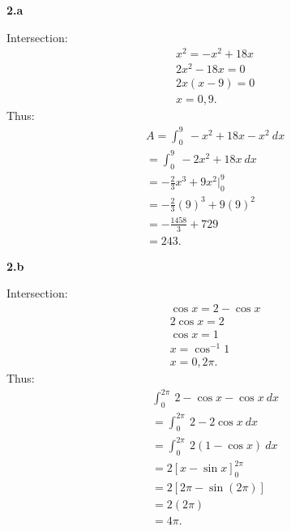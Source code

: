 \documentclass{report}
\begin{document}
    \bigbreak \noindent 
    \textbf{2.a}
    \bigbreak \noindent 
    \begin{minipage}[]{0.47\textwidth}
    \end{minipage}
    \begin{minipage}[]{0.47\textwidth}
    Intersection:
    \begin{align*}
        &x^{2} = -x^{2} + 18x \\
        &2x^{2} - 18x = 0  \\
        & 2x(x-9) = 0 \\
        &x=0,9
    .\end{align*}
    Thus:
    \begin{align*}
        &A = \int_{0}^{9}\ -x^{2}+18x-x^{2}\ dx \\
        &= \int_{0}^{9}\ -2x^{2}+18x\ dx \\
        &= -\frac{2}{3}x^{3} + 9x^{2} \bigg|_0^9 \\
        &= -\frac{2}{3}(9)^{3} + 9(9)^{2} \\
        &= -\frac{1458}{3} + 729 \\
        &=243
    .\end{align*}
    \end{minipage}
    \bigbreak \noindent 
    \textbf{2.b}
    \bigbreak \noindent 
    \begin{minipage}[]{0.47\textwidth}
    \end{minipage}
    \begin{minipage}[]{0.47\textwidth}
    Intersection:
    \begin{align*}
        &\cos{x} = 2-\cos{x} \\
        & 2\cos{x} = 2 \\
        &\cos{x} = 1 \\
        &x= \cos^{-1}{1} \\
        &x=0,2\pi
    .\end{align*}
    \bigbreak \noindent 
    Thus:
    \begin{align*}
        &\int_{0}^{2\pi}\ 2-\cos{x} - \cos{x}\ dx \\
        &=\int_{0}^{2\pi}\ 2-2\cos{x}\ dx \\
        &=\int_{0}^{2\pi}\ 2(1-\cos{x})\ dx \\
        &=2 \left[x-\sin{x}\right]^{2\pi}_0 \\
        &= 2 [2\pi-\sin{(2\pi)}] \\
        &= 2 (2\pi) \\
        &= 4\pi
    .\end{align*}
    \end{minipage}
\end{document}
